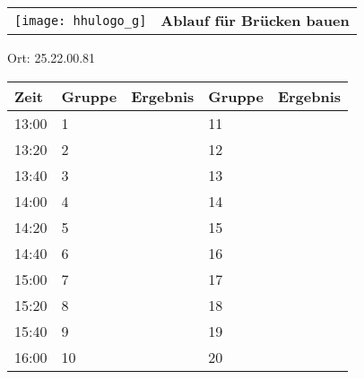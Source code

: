 \documentclass[a4paper,10pt]{article}
\def\spiela{Brücken bauen}
\def\rauma{25.22.00.81}
\begin{document}
  \begin{tabularx}{\textwidth}{lc}
    \texttt{[image: hhulogo\_g]}
  & {\Huge \textbf{Ablauf für \spiela}}
  \end{tabularx}
  \LARGE
  \begin{center}
    \vspace{1cm} 
    Ort: \rauma
  \end{center}
    \vspace{2cm} 
    \begin{tabularx}{\textwidth}{X||X|X||X|X}
	\textbf{Zeit} &\textbf{Gruppe} & \textbf{Ergebnis} &\textbf{Gruppe} & \textbf{Ergebnis}  	\\ \hline \hline
	13:00 &	1	&	&11	&	\\ \hline
	13:20 &	2	&	&12	&	\\ \hline
	13:40 &	3	&	&13	&	\\ \hline

	14:00 &	4	&	&14	&	\\ \hline
	14:20 &	5	&	&15	&	\\ \hline
	14:40 &	6	&	&16	&	\\ \hline

	15:00 &	7	&	&17	&	\\ \hline
	15:20 &	8	&	&18	&	\\ \hline
	15:40 &	9	&	&19	&	\\ \hline

	16:00 &	10	&	&20	&	\\ \hline
      
    \end{tabularx}
   
   \newpage
\end{document}
